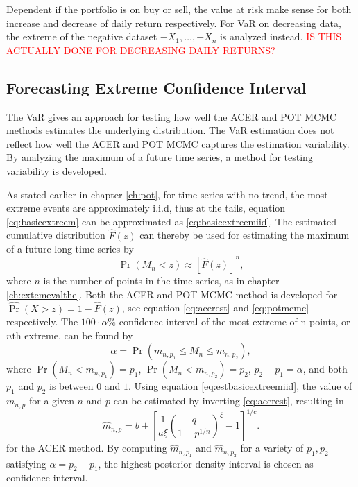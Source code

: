Dependent if the portfolio is on buy or sell, the value at risk make sense for both increase and decrease of daily return respectively. For VaR on decreasing data, the extreme of the negative dataset $-X_1,\dots,-X_n$ is analyzed instead.
\textcolor{red}{IS THIS ACTUALLY DONE FOR DECREASING DAILY RETURNS?}
\subsection{Forecasting Extreme Confidence Interval}
\label{ch:predconf}
The VaR gives an approach for testing how well the ACER and POT MCMC methods estimates the underlying distribution. The VaR estimation does not reflect how well the ACER and POT MCMC captures the estimation variability. By analyzing the maximum of a future time series, a method for testing variability is developed.

As stated earlier in chapter \ref{ch:pot}, for time series with no trend, the most extreme events are approximately i.i.d, thus at the tails, equation \eqref{eq:basicextreem} can be approximated as \eqref{eq:basicextreemiid}.  The estimated cumulative distribution $\hat{F}(z)$ can thereby be used for estimating the maximum of a future long time series by
\begin{equation}
\label{eq:estbasicextreemiid}
\Pr(M_n < z)\approx \left[ \hat{F}(z)\right]^n,
\end{equation}
where $n$ is the number of points in the time series, as in chapter \ref{ch:extemevalthe}.  Both the ACER and POT MCMC method is developed for $\hat{\Pr}(X>z)=1-\hat{F}(z)$, see equation \eqref{eq:acerest} and \eqref{eq:potmcmc} respectively. The $100 \cdot \alpha \%$ confidence interval of the most extreme of n points, or $n$th extreme, can be found by
\begin{equation}
\alpha=\Pr(m_{n,p_1} \leq M_n \leq m_{n,p_2}),
\end{equation}
where $\Pr(M_n < m_{n,p_1})=p_1$, $\Pr(M_n < m_{n,p_2})=p_2$, $p_2-p_1=\alpha$, and both $p_1$ and $p_2$ is between $0$ and $1$. Using equation \eqref{eq:estbasicextreemiid}, the value of $m_{n,p}$ for a given $n$ and $p$ can be estimated by inverting \eqref{eq:acerest}, resulting in 
\begin{equation}
\hat{m}_{n,p}= b+\left[\frac{1}{a \xi} \left(\frac{q}{ 1-p^{1/n} } \right)^{\xi}-1 \right]^{1/c}.
\end{equation}
for the ACER method. By computing $ \hat{m}_{n,p_1}$ and $ \hat{m}_{n,p_2}$ for a variety of $p_1,p_2$ satisfying $\alpha=p_2-p_1$, the highest posterior density interval is chosen as confidence interval.

